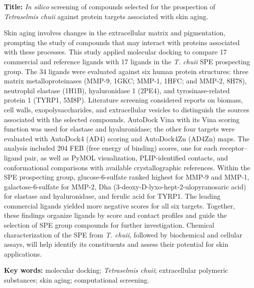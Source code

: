 \begingroup
\singlespacing
\noindent\textbf{Title:} \textit{In silico} screening of compounds selected for the prospection of \textit{Tetraselmis chuii} against protein targets associated with skin aging.\par
\vspace{0.5\baselineskip}
\noindent
Skin aging involves changes in the extracellular matrix and pigmentation, prompting the study of compounds that may interact with proteins associated with these processes. This study applied molecular docking to compare 17 commercial and reference ligands with 17 ligands in the \textit{T. chuii} SPE prospecting group. The 34 ligands were evaluated against six human protein structures: three matrix metalloproteinases (MMP-9, 1GKC; MMP-1, 1HFC; and MMP-2, 8H78), neutrophil elastase (1H1B), hyaluronidase 1 (2PE4), and tyrosinase-related protein 1 (TYRP1, 5M8P). Literature screening considered reports on biomass, cell walls, exopolysaccharides, and extracellular vesicles to distinguish the sources associated with the selected compounds. AutoDock Vina with its Vina scoring function was used for elastase and hyaluronidase; the other four targets were evaluated with AutoDock4 (AD4) scoring and AutoDock4Zn (AD4Zn) maps. The analysis included 204 FEB (free energy of binding) scores, one for each receptor--ligand pair, as well as PyMOL visualization, PLIP-identified contacts, and conformational comparisons with available crystallographic references. Within the SPE prospecting group, glucose-6-sulfate ranked highest for MMP-9 and MMP-1, galactose-6-sulfate for MMP-2, Dha (3-deoxy-D-lyxo-hept-2-ulopyranosaric acid) for elastase and hyaluronidase, and ferulic acid for TYRP1. The leading commercial ligands yielded more negative scores for all six targets. Together, these findings organize ligands by score and contact profiles and guide the selection of SPE group compounds for further investigation. Chemical characterization of the SPE from \textit{T. chuii}, followed by biochemical and cellular assays, will help identify its constituents and assess their potential for skin applications.

\vspace{\baselineskip}
\noindent\textbf{Key words:} molecular docking; \textit{Tetraselmis chuii}; extracellular polymeric substances; skin aging; computational screening.
\endgroup
